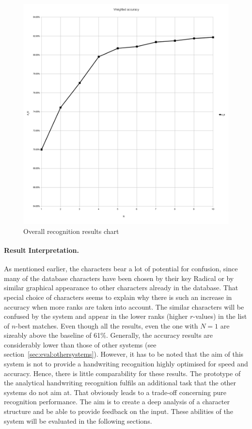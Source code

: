 \begin{figure}[htbp]
  \begin{center}
    \includegraphics[scale=0.5]{images/weightedAccuracyOverall.png}
    \caption{Overall recognition results chart}
    \label{fig:eval:overallrecognitionresults}
  \end{center}
\end{figure}

\paragraph{Result Interpretation.}
As mentioned earlier, the characters bear a lot of potential for confusion,
since many of the database characters have been chosen by their key Radical
or by similar graphical appearance to other characters already in the database.
That special choice of characters seems to explain why there is such an
increase in accuracy when more ranks are taken into account.
The similar characters will be confused by the system and appear in
the lower ranks (higher \(r\)-values) in the list of \(n\)-best matches.
Even though all the results, even the one with \(N = 1\) are sizeably above
the baseline of 61\%.
Generally, the accuracy results are considerably lower than those of other
systems (see section~\ref{sec:eval:othersystems}). 
However, it has to be noted that the aim of this system is not 
to provide a handwriting recognition highly optimised for speed and accuracy.
Hence, there is little comparability for these results. 
The prototype of the analytical handwriting recognition fulfils an additional 
task that the other systems do not aim at. That obviously leads to a trade-off
concerning pure recognition performance.
The aim is to create a deep analysis of a character structure and
be able to provide feedback on the input. These abilities of the system will
be evaluated in the following sections.

